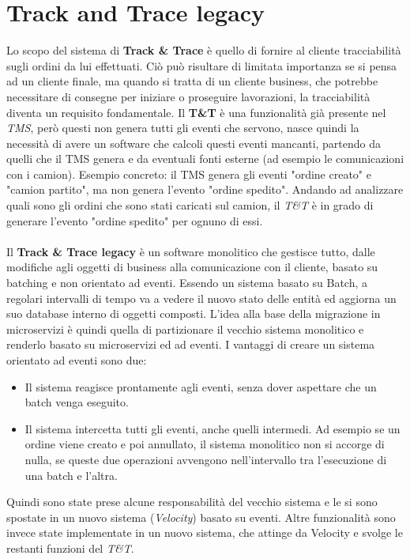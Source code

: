 \section{Track and Trace legacy}
\label{sec:T&T_old}
Lo scopo del sistema di \textbf{Track \& Trace}  è quello di fornire al cliente tracciabilità sugli ordini da lui effettuati.
Ciò può risultare di limitata importanza se si pensa ad un cliente finale, ma quando si tratta di un cliente business,
che potrebbe necessitare di consegne per iniziare o proseguire lavorazioni, la tracciabilità diventa un requisito fondamentale.
Il \textbf{T\&T} è una funzionalità già presente nel \textit{TMS}, però questi non genera tutti gli eventi che servono,
nasce quindi la necessità di avere un software che calcoli questi eventi mancanti, partendo da quelli che il TMS genera e da eventuali fonti esterne (ad esempio le comunicazioni con i camion). 
Esempio concreto: il TMS genera gli eventi "ordine creato" e "camion partito", ma non genera l'evento "ordine spedito". 
Andando ad analizzare quali sono gli ordini che sono stati caricati sul camion, il \textit{T\&T} è in grado di generare l'evento "ordine spedito" per ognuno di essi.
\\\\
Il \textbf{Track \& Trace legacy} è un software monolitico che gestisce tutto, dalle modifiche agli oggetti di business alla comunicazione con il cliente, basato su batching e non orientato ad eventi.
Essendo un sistema basato su Batch, a regolari intervalli di tempo va a vedere il nuovo stato delle entità ed aggiorna un suo database interno di oggetti composti.
L'idea alla base della migrazione in microservizi è quindi quella di partizionare il vecchio sistema monolitico e renderlo basato su microservizi ed ad eventi.
I vantaggi di creare un sistema orientato ad eventi sono due:
\begin{itemize}
    \item Il sistema reagisce prontamente agli eventi, senza dover aspettare che un batch venga eseguito.
    \item Il sistema intercetta tutti gli eventi, anche quelli intermedi. Ad esempio se un ordine viene creato e poi annullato, il sistema monolitico non si accorge di nulla, se queste due operazioni avvengono nell'intervallo tra l'esecuzione di una batch e l'altra. 
\end{itemize}
Quindi sono state prese alcune responsabilità del vecchio sistema e le si sono spostate in un nuovo sistema (\textit{Velocity}) basato su eventi.
Altre funzionalità sono invece state implementate in un nuovo sistema, che attinge da Velocity e svolge le restanti funzioni del \textit{T\&T}.
